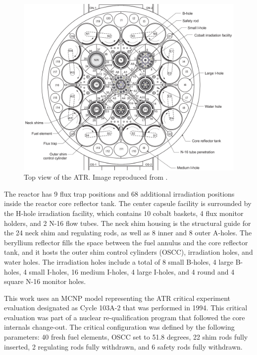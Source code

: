 \begin{figure}[htbp!] %
    \centering
    \includegraphics[width=0.85\linewidth]{figures/atr2}
    \hfill
    \caption{Top view of the ATR. Image reproduced from \cite{ICSBEP}.}
    \label{fig:atr}
\end{figure}

The reactor has 9 flux trap positions and 68 additional irradiation positions inside the reactor core reflector tank.
The center capsule facility is surrounded by the H-hole irradiation facility, which contains 10 cobalt baskets, 4 flux monitor holders, and 2 N-16 flow tubes.
The neck shim housing is the structural guide for the 24 neck shim and regulating rods, as well as 8 inner and 8 outer A-holes.
The beryllium reflector fills the space between the fuel annulus and the core reflector tank, and it hosts the outer shim control cylinders (OSCC), irradiation holes, and water holes.
The irradiation holes include a total of 8 small B-holes, 4 large B-holes, 4 small I-holes, 16 medium I-holes, 4 large I-holes, and 4 round and 4 square N-16 monitor holes.

This work uses an MCNP model representing the ATR critical experiment evaluation designated as Cycle 103A-2 that was performed in 1994.
This critical evaluation was part of a nuclear re-qualification program that followed the core internals change-out.
The critical configuration was defined by the following parameters: 40 fresh fuel elements, OSCC set to 51.8 degrees, 22 shim rods fully inserted, 2 regulating rods fully withdrawn, and 6 safety rods fully withdrawn.

